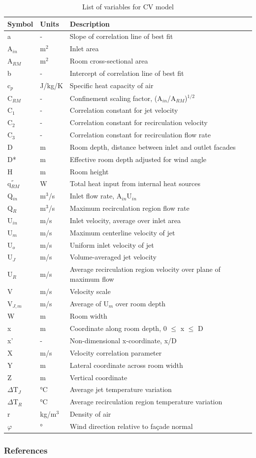 \begin{longtable}[c]{p{1.0in}p{1.0in}p{3.5in}}
\caption{List of variables for CV model \protect \label{table:list-of-variables-for-cv-model}}\\
\toprule 
Symbol & Units & Description \tabularnewline \midrule
\endhead
a & - & Slope of correlation line of best fit \tabularnewline
A\(_{in}\) & m\(^2\) & Inlet area \tabularnewline
A\(_{RM}\) & m\(^2\) & Room cross-sectional area \tabularnewline
b & - & Intercept of correlation line of best fit \tabularnewline
c\(_{p}\) & J/kg/K & Specific heat capacity of air \tabularnewline
C\(_{RM}\) & - & Confinement scaling factor, (A\(_{in}\)/A\(_{RM}\))\(^{1/2}\) \tabularnewline
C\(_{1}\) & - & Correlation constant for jet velocity \tabularnewline
C\(_{2}\) & - & Correlation constant for recirculation velocity \tabularnewline
C\(_{3}\) & - & Correlation constant for recirculation flow rate \tabularnewline
D & m & Room depth, distance between inlet and outlet facades \tabularnewline
D* & m & Effective room depth adjusted for wind angle \tabularnewline
H & m & Room height \tabularnewline
q\(^{''}_{RM}\) & W & Total heat input from internal heat sources \tabularnewline
Q\(_{in}\) & m\(^3\)/s & Inlet flow rate, A\(_{in}\)U\(_{in}\) \tabularnewline
Q\(_R\) & m\(^3\)/s & Maximum recirculation region flow rate \tabularnewline
U\(_{in}\) & m/s & Inlet velocity, average over inlet area \tabularnewline
U\(_{m}\) & m/s & Maximum centerline velocity of jet \tabularnewline
U\(_{o}\) & m/s & Uniform inlet velocity of jet \tabularnewline
U\(_{J}\) & m/s & Volume-averaged jet velocity \tabularnewline
U\(_{R}\) & m/s & Average recirculation region velocity over plane of maximum flow \tabularnewline
V & m/s & Velocity scale \tabularnewline
V\(_{J,m}\) & m/s & Average of U\(_{m}\) over room depth \tabularnewline
W & m & Room width \tabularnewline
x & m & Coordinate along room depth, 0 $\leq$ x $\leq$ D \tabularnewline
x' & - & Non-dimensional x-coordinate, x/D \tabularnewline
X & m/s & Velocity correlation parameter \tabularnewline
Y & m & Lateral coordinate across room width \tabularnewline
Z & m & Vertical coordinate \tabularnewline
$\Delta$T\(_{J}\) & °C & Average jet temperature variation \tabularnewline
$\Delta$T\(_{R}\) & °C & Average recirculation region temperature variation \tabularnewline
r & kg/m\(^3\) & Density of air \tabularnewline
$\varphi$ & ° & Wind direction relative to façade normal \tabularnewline
\bottomrule
\end{longtable}

\subsubsection{References}\label{references-5-000}

